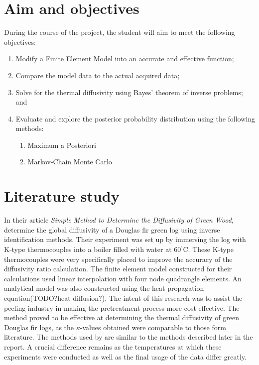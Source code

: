 \section{Aim and objectives}
During the course of the project, the student will aim to meet the following objectives:
\begin{enumerate}
 \item Modify a Finite Element Model into an accurate and effective function;
 \item Compare the model data to the actual acquired data;
 \item Solve for the thermal diffusivity using Bayes' theorem of inverse problems; and
 \item Evaluate and explore the posterior probability distribution using the following methods:
 	\begin{enumerate}
 		\item Maximum a Posteriori
 		\item Markov-Chain Monte Carlo 	
 	\end{enumerate}
\end{enumerate}

\section{Literature study}
	
	In their article \textit{Simple Method to Determine the Diffusivity of Green Wood}, \citeauthor{bioresource:2020}  determine the global diffusivity of a Douglas fir green log using inverse identification methods. 
	Their experiment was set up by immersing the log with K-type thermocouples into a boiler filled with water at 60$^{^{\circ}}$C. 
	These K-type thermocouples were very specifically placed to improve the accuracy of the diffusivity ratio calculation.
	The finite element model constructed for their calculations used linear interpolation with four node quadrangle elements.
	An analytical model was also constructed using the heat propagation equation(TODO?heat diffusion?).
	The intent of this research was to assist the peeling industry in making the pretreatment process more cost effective.
	The method proved to be effective at determining the thermal diffusivity of green Douglas fir logs, as the $\kappa$-values obtained were comparable to those form literature.
	The methods used by \citet{bioresource:2020} are similar to the methods described later in the report.
	A crucial difference remains as the temperatures at which these experiments were conducted as well as the final usage of the data differ greatly.

